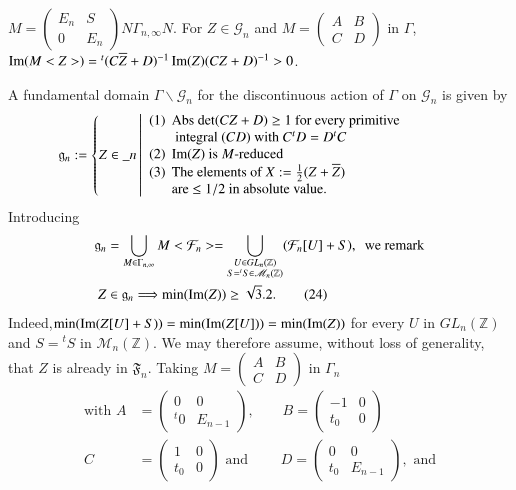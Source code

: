   $M=\left(\begin{smallmatrix} E_{n} & S\\ 0 & E_{n}
  \end{smallmatrix}\right)N\Gamma_{n,\infty}N$. For
  $Z\in\mathscr{G}_{n}$ and $M=\left(\begin{smallmatrix} A & B\\ C & D
  \end{smallmatrix}\right)$ in $\Gamma$,
  $\operatorname{Im}(M<Z>)={}^{t}(C\overline{Z}+D)^{-1}\operatorname{Im}(Z)(CZ+D)^{-1}>0$. 

A fundamental domain $\Gamma\backslash \mathscr{G}_{n}$ for the
discontinuous action of $\Gamma$ on $\mathscr{G}_{n}$ is given by
$$
\mathfrak{g}_{n}:=
\left\{
Z\in \_{n}\left|
\begin{array}{r@{\;\,}p{7cm}}
(1) & \text{Abs $\det (CZ+D)\geq 1$ for every primitive} \text{ integral $(CD)$ with
  $C{}^{t}D=D{}^{t}C$}\\
(2) & \text{$\Iim(Z)$ is $M$-reduced}\\
(3) & \text{The elements of $X:=\frac{1}{2}(Z+\ob{Z})$}\break \text{are $\leq 1/2$ in
  absolute value.}
\end{array}
\right.\right.
$$
Introducing 
\begin{align*}
\mathfrak{g}_{n} &=
\bigcup_{M\in\Gamma_{n,\infty}}M <\mathcal{F}_{n}>=\bigcup_{\substack{U\in
GL_{n}(\mathbb{Z})\\ S={}^{t}S\in
\mathscr{M}_{n}(\mathbb{Z})}}(\mathcal{F}_{n}[U]+S), \text{ \  we
  remark}\\
Z &\in \mathfrak{g}_{n}\Longrightarrow \min(\operatorname{Im} (Z))\geq
\sqrt{3}.2.\tag{24}\label{c1:eq24} 
\end{align*}
Indeed,\pageoriginale $\min(\operatorname{Im}(Z[U]+S))=\min (\operatorname{Im} (Z[U]))=\min
(\operatorname{Im}(Z))$ for every $U$ in $GL_{n}(\mathbb{Z})$ and $S={}^{t}S$ in
$\mathscr{M}_{n}(\mathbb{Z})$. We may therefore assume, without loss
of generality, that $Z$ is already in $\mathfrak{F}_{n}$. Taking
$M=\left(\begin{smallmatrix} A & B\\ C & D
\end{smallmatrix}\right)$ in $\Gamma_{n}$ 
\begin{align*}
\text{with } A&=
\begin{pmatrix}
0 & 0\\
{}^{t}0 & E_{n-1}
\end{pmatrix}
,\qquad B=
\begin{pmatrix}
-1 & 0\\
t_{0} & 0
\end{pmatrix}\\
C&=
\begin{pmatrix}
1 & 0\\
t_{0} & 0
\end{pmatrix}
\text{ \  and \ }\qquad D=
\begin{pmatrix}
0 & 0\\
t_{0} & E_{n-1}
\end{pmatrix},\text{ \  and}
\end{align*}
